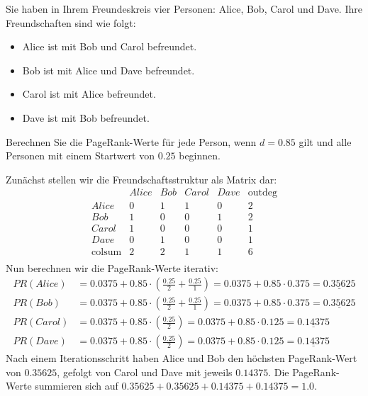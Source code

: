 \begin{myexercise}
    Sie haben in Ihrem Freundeskreis vier Personen: Alice, Bob, Carol und Dave. Ihre Freundschaften sind wie folgt:
    \begin{itemize}
        \item Alice ist mit Bob und Carol befreundet.
        \item Bob ist mit Alice und Dave befreundet.
        \item Carol ist mit Alice befreundet.
        \item Dave ist mit Bob befreundet.
    \end{itemize}
    Berechnen Sie die PageRank-Werte für jede Person, wenn $d=0.85$ gilt und alle Personen mit einem Startwert von $0.25$ beginnen.

    \begin{myanswer}
    Zunächst stellen wir die Freundschaftsstruktur als Matrix dar:
    \[
        \begin{array}{c|cccc|c}
                          & Alice & Bob & Carol & Dave & \text{outdeg} \\
            \hline
            Alice         & 0     & 1   & 1     & 0    & 2             \\
            Bob           & 1     & 0   & 0     & 1    & 2             \\
            Carol         & 1     & 0   & 0     & 0    & 1             \\
            Dave          & 0     & 1   & 0     & 0    & 1             \\
            \hline
            \text{colsum} & 2     & 2   & 1     & 1    & 6             \\
        \end{array}
    \]
    Nun berechnen wir die PageRank-Werte iterativ:
    \[
    \begin{aligned}
        PR(Alice) & = 0.0375 + 0.85 \cdot \left(\frac{0.25}{2} + \frac{0.25}{1}\right) = 0.0375 + 0.85 \cdot 0.375 = \underline{0.35625} \\
        PR(Bob)   & = 0.0375 + 0.85 \cdot \left(\frac{0.25}{2} + \frac{0.25}{1}\right) = 0.0375 + 0.85 \cdot 0.375 = \underline{0.35625} \\
        PR(Carol) & = 0.0375 + 0.85 \cdot \left(\frac{0.25}{2}\right) = 0.0375 + 0.85 \cdot 0.125 = \underline{0.14375} \\
        PR(Dave)  & = 0.0375 + 0.85 \cdot \left(\frac{0.25}{2}\right) = 0.0375 + 0.85 \cdot 0.125 = \underline{0.14375}
    \end{aligned}
    \]
    Nach einem Iterationsschritt haben Alice und Bob den höchsten PageRank-Wert von $0.35625$, gefolgt von Carol und Dave mit jeweils $0.14375$. Die PageRank-Werte summieren sich auf $0.35625 + 0.35625 + 0.14375 + 0.14375 = 1.0$.
    \end{myanswer}
\end{myexercise}

